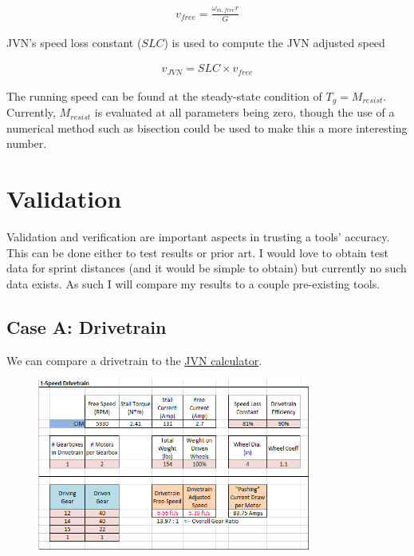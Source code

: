 \documentclass[10pt,letterpaper]{article}
\begin{document}
	\begin{align}
		v_{free} = \frac{\omega_{m,free} r}{G}
	\end{align}

	JVN's speed loss constant ($SLC$) is used to compute the JVN adjusted speed

	\begin{align}
		v_{JVN} = SLC \times v_{free}
	\end{align}

	The running speed can be found at the steady-state condition of $T_g = M_{resist}$. Currently, $M_{resist}$ is evaluated at all parameters being zero, though the use of a numerical method such as bisection could be used to make this a more interesting number.

	\section{Validation}
	Validation and verification are important aspects in trusting a tools' accuracy. This can be done either to test results or prior art. I would love to obtain test data for sprint distances (and it would be simple to obtain) but currently no such data exists. As such I will compare my results to a couple pre-existing tools.

	\newpage
	\subsection*{Case A: Drivetrain}
	We can compare a drivetrain to the \href{https://www.chiefdelphi.com/t/paper-jvns-mechanical-design-calculator-2016/146281}{\underline{JVN calculator}}.

	\begin{figure}[H]
		\includegraphics[width=0.80\textwidth]{validation/mechanism_JVN_A.png}
	\end{figure}
\end{document}
